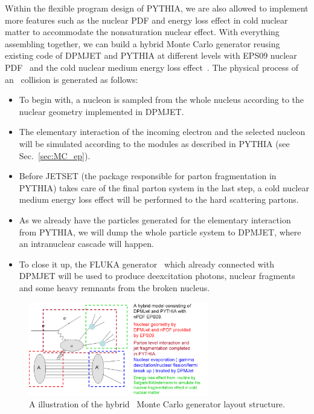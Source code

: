 Within the flexible program design of PYTHIA, we are also allowed to implement
more features such as the nuclear PDF and energy loss effect in cold nuclear
matter to accommodate the nonsaturation nuclear effect. 
With everything assembling together, we can build a hybrid Monte Carlo generator reusing existing
code of DPMJET and PYTHIA at different levels with EPS09 nuclear PDF~\cite{Eskola:2009uj}
and the cold nuclear medium energy loss effect~\cite{Salgado:2003gb}. The physical process of an \eA\ collision is
generated as follows:

\begin{itemize}
    \item To begin with, a nucleon is sampled from the whole nucleus according to the nuclear geometry implemented in DPMJET.
    \item The elementary interaction of the incoming electron and the selected nucleon will be simulated according to the modules as described in PYTHIA (see Sec.~\ref{sec:MC_ep}).
    \item Before JETSET (the package responsible for parton fragmentation in PYTHIA) takes care of the final parton system in the last step, a cold nuclear medium energy loss effect will be performed to the hard scattering partons. 
    \item As we already have the particles generated for the elementary interaction from PYTHIA, we will dump the whole particle system to DPMJET, where an intranuclear cascade will happen.
    \item To close it up, the FLUKA generator~\cite{Ferrari:1995cq} which already connected with DPMJET will be used to produce deexcitation photons, nuclear fragments and some heavy remnants from the broken nucleus.
\end{itemize}

\begin{figure}
\centering
\includegraphics[width=0.7\textwidth]{plots/chpt5/eA_hybrid_chart.png} 
\caption[The hybrid \eA\ generator setup] {
A illustration of the hybrid \eA\ Monte Carlo generator layout structure. }
\label{fig:MC_hybrid_chart}
\end{figure}

